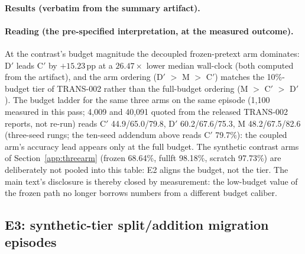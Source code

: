 \documentclass[11pt,a4paper]{article}
\begin{document}
\paragraph{Results (verbatim from the summary artifact).}
\begin{center}
%
\end{center}

\paragraph{Reading (the pre-specified interpretation, at the measured outcome).}
At the contrast's budget magnitude the decoupled frozen-pretext arm dominates: D$'$ leads C$'$ by $+15.23$\,pp at a $26.47\times$ lower median wall-clock (both computed from the artifact), and the arm ordering (D$'$ $>$ M $>$ C$'$) matches the 10\%-budget tier of TRANS-002 rather than the full-budget ordering (M $>$ C$'$ $>$ D$'$). The budget ladder for the same three arms on the same episode (1{,}100 measured in this pass; 4{,}009 and 40{,}091 quoted from the released TRANS-002 reports, not re-run) reads C$'$ 44.9/65.0/79.8, D$'$ 60.2/67.6/75.3, M 48.2/67.5/82.6 (three-seed rungs; the ten-seed addendum above reads C$'$ 79.7\%): the coupled arm's accuracy lead appears only at the full budget. The synthetic contrast arms of Section~\ref{app:threearm} (frozen 68.64\%, fullft 98.18\%, scratch 97.73\%) are deliberately not pooled into this table: E2 aligns the budget, not the tier. The main text's disclosure is thereby closed by measurement: the low-budget value of the frozen path no longer borrows numbers from a different budget caliber.

\subsection{E3: synthetic-tier split/addition migration episodes}\label{app:synthmigration}
\end{document}
